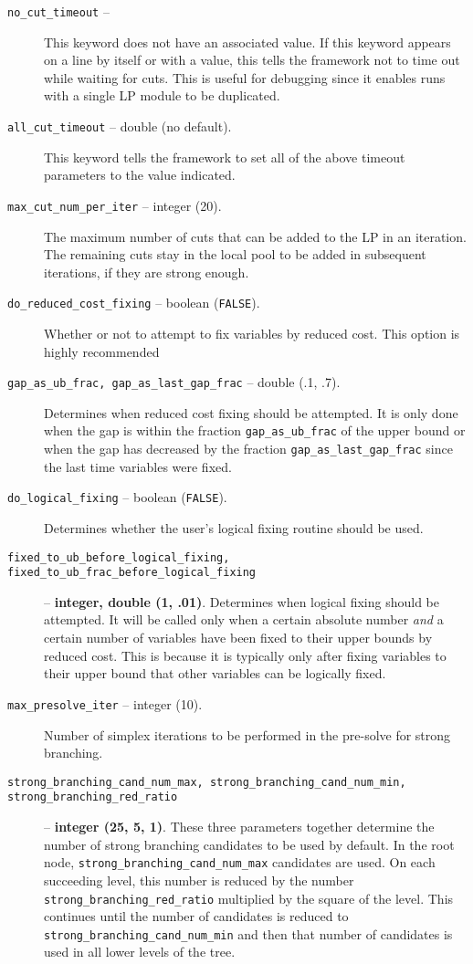 \begin{description}
\item[{\tt no\_cut\_timeout} -- ]
This keyword does not have an associated value. If this keyword
appears on a line by itself or with a value, this tells the framework
not to time out while waiting for cuts. This is useful for debugging
since it enables runs with a single LP module to be duplicated.

\item[{\tt all\_cut\_timeout} -- double (no default).]
This keyword tells the framework to set all of the above timeout
parameters to the value indicated.

\item[{\tt max\_cut\_num\_per\_iter} -- integer (20).]
The maximum number of cuts that can be added to the LP in an
iteration. The remaining cuts stay in the local pool to be added in
subsequent iterations, if they are strong enough.

\item[{\tt do\_reduced\_cost\_fixing} -- boolean ({\tt FALSE}).]
Whether or not to attempt to fix variables by reduced cost. This
option is highly recommended

\item[{\tt gap\_as\_ub\_frac, gap\_as\_last\_gap\_frac} -- double (.1, .7).]
Determines when reduced cost fixing should be attempted. It is only
done when the gap is within the fraction {\tt gap\_as\_ub\_frac} of the upper
bound or when the gap has decreased by the fraction 
{\tt gap\_as\_last\_gap\_frac} since the last time variables were fixed.

\item[{\tt do\_logical\_fixing} -- boolean ({\tt FALSE}).]
Determines whether the user's logical fixing routine should be used.

\item[{\tt fixed\_to\_ub\_before\_logical\_fixing,
fixed\_to\_ub\_frac\_before\_logical\_fixing}] -- {\bf integer, double
(1, .01)}.
Determines when logical fixing should be attempted. It will be called
only when a certain absolute number {\em and} a certain number of variables
have been fixed to their upper bounds by reduced cost. This is because
it is typically only after fixing variables to their upper bound that
other variables can be logically fixed.

\label{strong_branching}
\item[{\tt max\_presolve\_iter} -- integer (10).]
Number of simplex iterations to be performed in the pre-solve for
strong branching.

\item[{\tt strong\_branching\_cand\_num\_max,
strong\_branching\_cand\_num\_min, strong\_branching\_red\_ratio}] --
{\bf integer (25, 5, 1)}.
These three parameters together determine the number of strong
branching candidates to be used by default. In the root node,
{\tt strong\_branching\_cand\_num\_max} candidates are used. On each
succeeding level, this number is reduced by the number {\tt
strong\_branching\_red\_ratio} multiplied by the square of the level.
This continues until the number of candidates is reduced to {\tt
strong\_branching\_cand\_num\_min} and then that number of candidates
is used in all lower levels of the tree.


\end{description}
